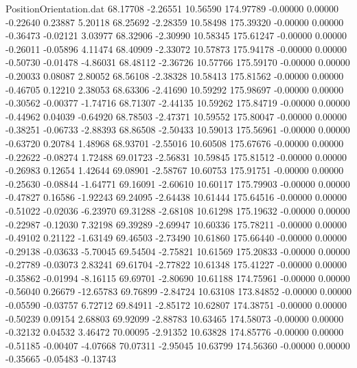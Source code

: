 \begin{filecontents}{PositionOrientation.dat}
  68.17708   -2.26551   10.56590   174.97789   -0.00000    0.00000   -0.22640    0.23887    5.20118
  68.25692   -2.28359   10.58498   175.39320   -0.00000    0.00000   -0.36473   -0.02121    3.03977
  68.32906   -2.30990   10.58345   175.61247   -0.00000    0.00000   -0.26011   -0.05896    4.11474
  68.40909   -2.33072   10.57873   175.94178   -0.00000    0.00000   -0.50730   -0.01478   -4.86031
  68.48112   -2.36726   10.57766   175.59170   -0.00000    0.00000   -0.20033    0.08087    2.80052
  68.56108   -2.38328   10.58413   175.81562   -0.00000    0.00000   -0.46705    0.12210    2.38053
  68.63306   -2.41690   10.59292   175.98697   -0.00000    0.00000   -0.30562   -0.00377   -1.74716
  68.71307   -2.44135   10.59262   175.84719   -0.00000    0.00000   -0.44962    0.04039   -0.64920
  68.78503   -2.47371   10.59552   175.80047   -0.00000    0.00000   -0.38251   -0.06733   -2.88393
  68.86508   -2.50433   10.59013   175.56961   -0.00000    0.00000   -0.63720    0.20784    1.48968
  68.93701   -2.55016   10.60508   175.67676   -0.00000    0.00000   -0.22622   -0.08274    1.72488
  69.01723   -2.56831   10.59845   175.81512   -0.00000    0.00000   -0.26983    0.12654    1.42644
  69.08901   -2.58767   10.60753   175.91751   -0.00000    0.00000   -0.25630   -0.08844   -1.64771
  69.16091   -2.60610   10.60117   175.79903   -0.00000    0.00000   -0.47827    0.16586   -1.92243
  69.24095   -2.64438   10.61444   175.64516   -0.00000    0.00000   -0.51022   -0.02036   -6.23970
  69.31288   -2.68108   10.61298   175.19632   -0.00000    0.00000   -0.22987   -0.12030    7.32198
  69.39289   -2.69947   10.60336   175.78211   -0.00000    0.00000   -0.49102    0.21122   -1.63149
  69.46503   -2.73490   10.61860   175.66440   -0.00000    0.00000   -0.29138   -0.03633   -5.70045
  69.54504   -2.75821   10.61569   175.20833   -0.00000    0.00000   -0.27789   -0.03073    2.83241
  69.61704   -2.77822   10.61348   175.41227   -0.00000    0.00000   -0.35862   -0.01994   -8.16115
  69.69701   -2.80690   10.61188   174.75961   -0.00000    0.00000   -0.56040    0.26679  -12.65783
  69.76899   -2.84724   10.63108   173.84852   -0.00000    0.00000   -0.05590   -0.03757    6.72712
  69.84911   -2.85172   10.62807   174.38751   -0.00000    0.00000   -0.50239    0.09154    2.68803
  69.92099   -2.88783   10.63465   174.58073   -0.00000    0.00000   -0.32132    0.04532    3.46472
  70.00095   -2.91352   10.63828   174.85776   -0.00000    0.00000   -0.51185   -0.00407   -4.07668
  70.07311   -2.95045   10.63799   174.56360   -0.00000    0.00000   -0.35665   -0.05483   -0.13743

\end{filecontents}
